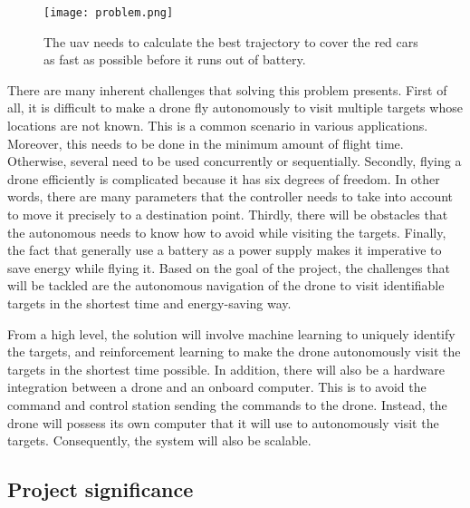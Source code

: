 \documentclass[../main.tex]{subfiles}
\begin{document}
\begin{figure}[tb] 
    \centering
    \texttt{[image: problem.png]} 
    \caption{The \gls{uav} needs to calculate 
    the best trajectory to cover the red cars
    as fast as possible before it runs out of battery.} 
    \label{fig:problem} 
\end{figure}

There are many inherent challenges that solving this problem
presents. First of all, it is difficult to make a drone
fly autonomously to visit multiple targets whose locations
are not known. 
This is a common scenario in various applications. 
Moreover, this needs to be done in the minimum
amount of flight time.
Otherwise, several \uavs need to be used concurrently
or sequentially.
Secondly, flying a drone efficiently is complicated 
because it has six degrees of freedom. In other words, 
there are many parameters that the controller needs to 
take into account to move 
it precisely to a destination point. 
Thirdly, there will be obstacles that the autonomous \uav
needs to know how to avoid while visiting the targets.
Finally, the fact that \uavs generally use a battery
as a power supply makes it imperative to save energy 
while flying it.
Based on the goal of the project, the challenges that will be 
tackled are the autonomous navigation
of the drone to visit identifiable targets in the shortest
time and energy-saving way.

From a high level, the solution will involve machine learning
to uniquely identify the targets, and reinforcement learning
to make the drone autonomously visit the targets in the
shortest time possible. In addition, there will also be
a hardware integration between a drone and an onboard
computer. This is to avoid the command and control
station sending the commands to the drone. Instead, the drone
will possess its own computer that it will use to 
autonomously visit the targets. Consequently, the system 
will also be scalable.

\subsection{Project significance}
\end{document}
